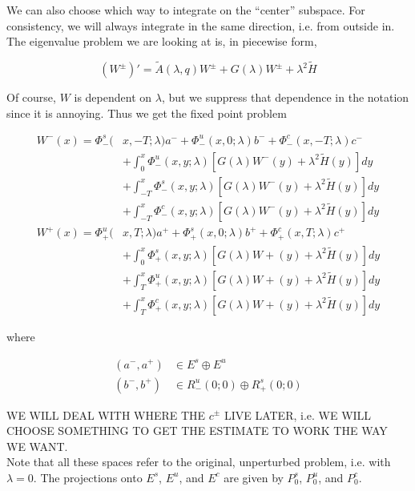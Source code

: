 \documentclass[12pt]{article}
\begin{document}
We can also choose which way to integrate on the ``center'' subspace. For consistency, we will always integrate in the same direction, i.e. from outside in.\\

The eigenvalue problem we are looking at is, in piecewise form,

\[
(W^\pm)' = \tilde{A}(\lambda, q) W^\pm + G(\lambda)W^\pm + \lambda^2 \tilde{H}
\]

Of course, $W$ is dependent on $\lambda$, but we suppress that dependence in the notation since it is annoying. Thus we get the fixed point problem

\begin{align*}
W^-(x) = \Phi^s_-(&x, -T; \lambda)a^- + \Phi^u_-(x, 0; \lambda)b^- + \Phi^c_-(x, -T; \lambda)c^- \\
&+ \int_0^x \Phi^u_-(x, y; \lambda)[ G(\lambda)W^-(y) + \lambda^2 \tilde{H}(y) ] dy \\
&+ \int_{-T}^x \Phi^s_-(x, y; \lambda) [ G(\lambda)W^-(y) + \lambda^2 \tilde{H}(y) ] dy \\
&+ \int_{-T}^x \Phi^c_-(x, y; \lambda) [ G(\lambda)W^-(y) + \lambda^2 \tilde{H}(y) ]dy \\
W^+(x) = \Phi^u_+(&x, T; \lambda)a^+ + \Phi^s_+(x, 0; \lambda)b^+ + \Phi^c_+(x, T; \lambda)c^+ \\
&+ \int_0^x \Phi^s_+(x, y; \lambda) [ G(\lambda)W+(y) + \lambda^2 \tilde{H}(y) ] dy \\
&+ \int_T^x \Phi^u_+(x, y; \lambda) [ G(\lambda)W+(y) + \lambda^2 \tilde{H}(y) ] dy \\
&+ \int_T^x \Phi^c_+(x, y; \lambda) [ G(\lambda)W+(y) + \lambda^2 \tilde{H}(y) ] dy
\end{align*}

where

\begin{align*}
(a^-, a^+) &\in E^s \oplus E^u\\
(b^-, b^+) &\in R^u_-(0; 0) \oplus R^s_+(0; 0)
\end{align*}

WE WILL DEAL WITH WHERE THE $c^\pm$ LIVE LATER, i.e. WE WILL CHOOSE SOMETHING TO GET THE ESTIMATE TO WORK THE WAY WE WANT.\\

Note that all these spaces refer to the original, unperturbed problem, i.e. with $\lambda = 0$. The projections onto $E^s$, $E^u$, and $E^c$ are given by $P_0^s$, $P_0^u$, and $P_0^c$.\\
\end{document}
